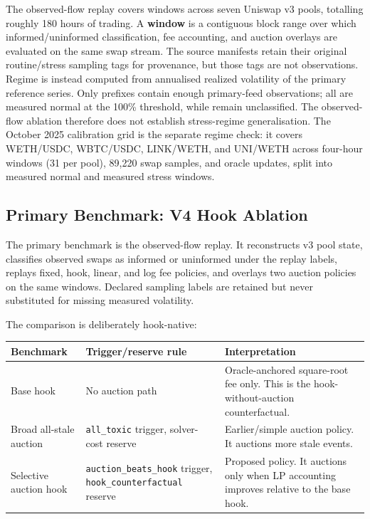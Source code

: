 \documentclass[11pt]{article}
\begin{document}
The observed-flow replay covers \EvidenceAblationWindows{} windows across seven Uniswap v3 pools, totalling roughly 180 hours of trading. A \textbf{window} is a contiguous block range over which informed/uninformed classification, fee accounting, and auction overlays are evaluated on the same swap stream. The source manifests retain their original routine/stress sampling tags for provenance, but those tags are not observations. Regime is instead computed from annualised realized volatility of the primary reference series. Only \EvidenceMeasuredAblationWindows{} prefixes contain enough primary-feed observations; all are measured normal at the 100\% threshold, while \EvidenceUnmeasurableAblationWindows{} remain unclassified. The observed-flow ablation therefore does not establish stress-regime generalisation. The October 2025 calibration grid is the separate regime check: it covers WETH/USDC, WBTC/USDC, LINK/WETH, and UNI/WETH across \EvidenceOctoberWindows{} four-hour windows (31 per pool), 89{,}220 swap samples, and \EvidenceOctoberOracleUpdates{} oracle updates, split into \EvidenceOctoberNormal{} measured normal and \EvidenceOctoberStress{} measured stress windows.

\subsection{Primary Benchmark: V4 Hook Ablation}
The primary benchmark is the observed-flow replay. It reconstructs v3 pool state, classifies observed swaps as informed or uninformed under the replay labels, replays fixed, hook, linear, and log fee policies, and overlays two auction policies on the same \EvidenceAblationWindows{} windows. Declared sampling labels are retained but never substituted for missing measured volatility.

The comparison is deliberately hook-native:
\begin{center}
\begin{tabular}{p{}p{}p{}}
\toprule
Benchmark & Trigger/reserve rule & Interpretation \\
\midrule
Base hook & No auction path & Oracle-anchored square-root fee only. This is the hook-without-auction counterfactual. \\
Broad all-stale auction & \texttt{all\_toxic} trigger, solver-cost reserve & Earlier/simple auction policy. It auctions more stale events. \\
Selective auction hook & \texttt{auction\_beats\_hook} trigger, \texttt{hook\_counterfactual} reserve & Proposed policy. It auctions only when LP accounting improves relative to the base hook. \\
\bottomrule
\end{tabular}
\end{center}
\end{document}
